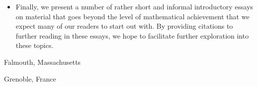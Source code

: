 \begin{itemize}
\item
Finally, we present a number of rather short and informal introductory
essays on material that goes beyond the level of mathematical
achievement that we expect many of our readers to start out with.  By
providing citations to further reading in these essays, we hope to
facilitate further exploration into these topics.
\end{itemize}

\bigskip

\hfill Falmouth, Massachusetts

\hfill Grenoble, France



